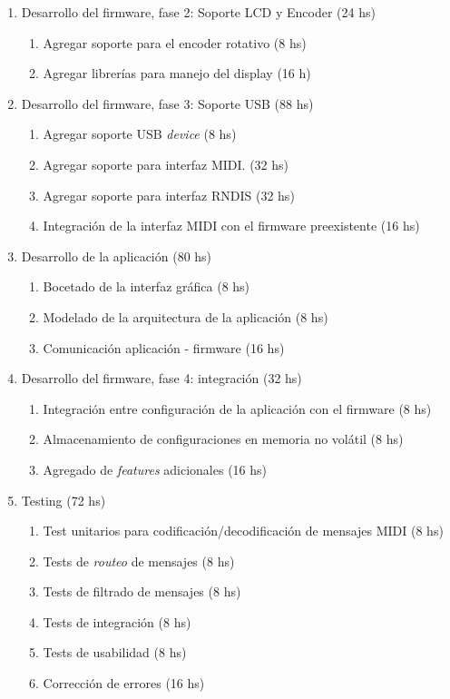 \documentclass[
11pt, %
]{charter}
\begin{document}
\begin{enumerate}
	\item Desarrollo del firmware, fase 2: Soporte LCD y Encoder (24 hs)
	\begin{enumerate}
		\item Agregar soporte para el encoder rotativo (8 hs)
		\item Agregar librerías para manejo del display (16 h)
	\end{enumerate}
	
	\item Desarrollo del firmware, fase 3: Soporte USB (88 hs)
	\begin{enumerate}
		\item Agregar soporte USB \emph{device} (8 hs)
		\item Agregar soporte para interfaz MIDI. (32 hs)
		\item Agregar soporte para interfaz RNDIS (32 hs)
		\item Integración de la interfaz MIDI con el firmware preexistente (16 hs)
	\end{enumerate}
	
	\item Desarrollo de la aplicación (80 hs)
	\begin{enumerate}
		\item Bocetado de la interfaz gráfica (8 hs)
		\item Modelado de la arquitectura de la aplicación (8 hs)
		\item Comunicación aplicación - firmware (16 hs)
	\end{enumerate}
	
	\item Desarrollo del firmware, fase 4: integración (32 hs)
	\begin{enumerate}
		\item Integración entre configuración de la aplicación con el firmware (8 hs)
		\item Almacenamiento de configuraciones en memoria no volátil (8 hs)
		\item Agregado de \emph{features} adicionales (16 hs)
	\end{enumerate}
	
	\item Testing (72 hs)
	\begin{enumerate}
		\item Test unitarios para codificación/decodificación de mensajes MIDI (8 hs)
		\item Tests de \emph{routeo} de mensajes (8 hs)
		\item Tests de filtrado de mensajes (8 hs)
		\item Tests de integración (8 hs)
		\item Tests de usabilidad (8 hs)
		\item Corrección de errores (16 hs)
	\end{enumerate}
	

\end{enumerate}
\end{document}
